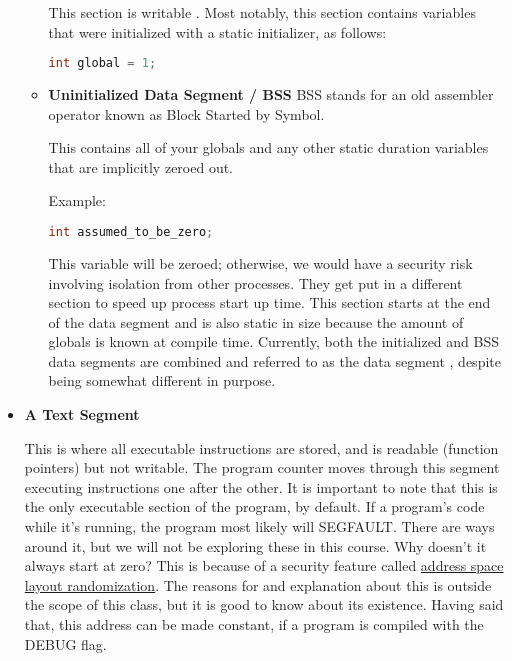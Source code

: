 \begin{itemize}
\begin{itemize}
          This section is writable \cite[P. 124]{van1994expert}.
          Most notably, this section contains variables that were initialized with a static initializer, as follows:

\begin{lstlisting}[language=C]
int global = 1;
\end{lstlisting}

    \item \textbf{Uninitialized Data Segment / BSS}
          BSS stands for an old assembler operator known as Block Started by Symbol.

          This contains all of your globals and any other static duration variables that are implicitly zeroed out.

          Example:
\begin{lstlisting}[language=C]
int assumed_to_be_zero;
\end{lstlisting}

          This variable will be zeroed; otherwise, we would have a security risk involving isolation from other processes.
          They get put in a different section to speed up process start up time.
          This section starts at the end of the data segment and is also static in size because the amount of globals is known at compile time.
          Currently, both the initialized and BSS data segments are combined and referred to as the data segment \cite[P. 124]{van1994expert}, despite being somewhat different in purpose.

\end{itemize}

\item \textbf{A Text Segment}

This is where all executable instructions are stored, and is readable (function pointers) but not writable.
The program counter moves through this segment executing instructions one after the other.
It is important to note that this is the only executable section of the program, by default.
If a program's code while it's running, the program most likely will SEGFAULT.
There are ways around it, but we will not be exploring these in this course.
Why doesn't it always start at zero?
This is because of a security feature called \href{https://en.wikipedia.org/wiki/Address_space_layout_randomization}{address space layout randomization}.
The reasons for and explanation about this is outside the scope of this class, but it is good to know about its existence.
Having said that, this address can be made constant, if a program is compiled with the DEBUG flag.

\end{itemize}


